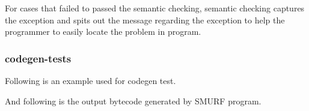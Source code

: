For cases that failed to passed the semantic checking, 
semantic checking captures the exception and spits out the message regarding the exception 
to help the programmer to easily locate the problem in program.



\subsubsection{codegen-tests}
Following is an example used for codegen test. 

And following is the output bytecode generated by SMURF program.



